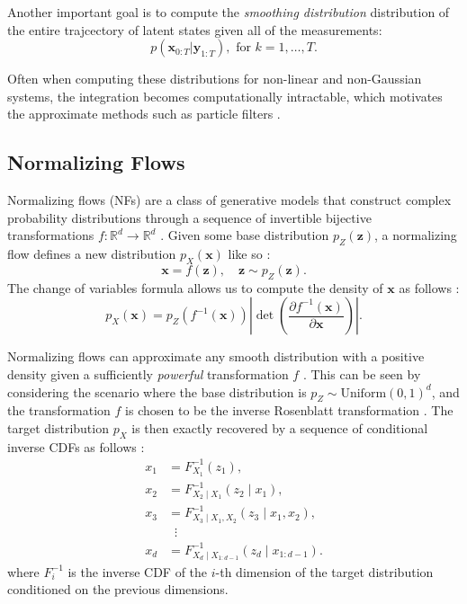 \documentclass[11pt,a4paper]{article}
\begin{document}
\noindent Another important goal is to compute the \textit{smoothing distribution} distribution of the entire trajcectory of latent states given all of the measurements:
\begin{equation}
    p(\mathbf{x}_{0:T} \big| \mathbf{y}_{1:T}), \text{ for } k = 1, \ldots , T.
\end{equation}

\noindent Often when computing these distributions for non-linear and non-Gaussian systems, the integration becomes computationally intractable, which motivates the approximate methods such as particle filters \cite{sarkka2023bayesian}.

\subsection{Normalizing Flows}

Normalizing flows (NFs) are a class of generative models that construct complex probability distributions through a sequence of invertible bijective transformations $f : \mathbb{R}^d \to \mathbb{R}^d$ \cite{razaghi2019filtering,kingma2018glow,rezende2015variational,dinh2017density}. Given some base distribution $p_Z(\mathbf{z})$, a normalizing flow defines a new distribution $p_X(\mathbf{x})$ like so \cite{murphy2023probabilistic}:
\begin{equation}
    \mathbf{x} = f(\mathbf{z}), \quad \mathbf{z} \sim p_Z(\mathbf{z}).
\end{equation}
\noindent The change of variables formula allows us to compute the density of $\mathbf{x}$ as follows \cite{razaghi2019filtering, kingma2018glow,rezende2015variational,dinh2017density}:
\begin{equation}
    p_X(\mathbf{x}) = p_Z(f^{-1}(\mathbf{x})) \left| \det \left( \frac{\partial f^{-1}(\mathbf{x})}{\partial \mathbf{x}} \right) \right|.
\end{equation}

Normalizing flows can approximate any smooth distribution with a positive density given a sufficiently \textit{powerful} transformation $f$ \cite{murphy2023probabilistic}. This can be seen by considering the scenario where the base distribution is $p_Z \sim \text{Uniform}(0, 1)^d$, and the transformation $f$ is chosen to be the inverse Rosenblatt transformation \cite{rosenblatt1952remarks}. The target distribution $p_X$ is then exactly recovered by a sequence of conditional inverse CDFs as follows \cite{murphy2023probabilistic, Pap19}:
\begin{equation}
\label{eq:11}
\begin{aligned}
x_1 &= F^{-1}_{X_1}(z_1), \\
x_2 &= F^{-1}_{X_2 \mid X_1}(z_2 \mid x_1), \\
x_3 &= F^{-1}_{X_3 \mid X_1, X_2}(z_3 \mid x_1, x_2), \\
&\;\;\vdots \\
x_d &= F^{-1}_{X_d \mid X_{1:d-1}}(z_d \mid x_{1:d-1}).
\end{aligned}
\end{equation}
\noindent where $F_i^{-1}$ is the inverse CDF of the $i$-th dimension of the target distribution conditioned on the previous dimensions.
\end{document}
